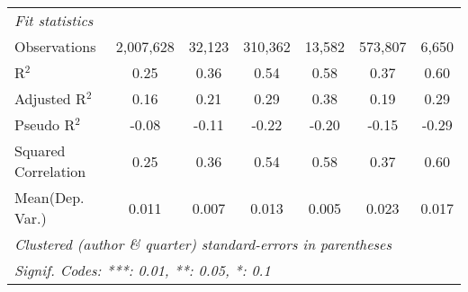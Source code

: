 \begin{tabular}{lcccccc}
   \midrule
   \emph{Fit statistics}\\
   Observations                                               & 2,007,628     & 32,123   & 310,362      & 13,582       & 573,807       & 6,650\\  
   R$^2$                                                      & 0.25          & 0.36     & 0.54         & 0.58         & 0.37          & 0.60\\  
   Adjusted R$^2$                                             & 0.16          & 0.21     & 0.29         & 0.38         & 0.19          & 0.29\\  
   Pseudo R$^2$                                               & -0.08         & -0.11    & -0.22        & -0.20        & -0.15         & -0.29\\  
   Squared Correlation                                        & 0.25          & 0.36     & 0.54         & 0.58         & 0.37          & 0.60\\  
Mean(Dep. Var.) & 0.011 & 0.007 & 0.013 & 0.005 & 0.023 & 0.017 \\
   \midrule \midrule
   \multicolumn{7}{l}{\emph{Clustered (author \& quarter) standard-errors in parentheses}}\\
   \multicolumn{7}{l}{\emph{Signif. Codes: ***: 0.01, **: 0.05, *: 0.1}}\\
\end{tabular}
\par\endgroup
